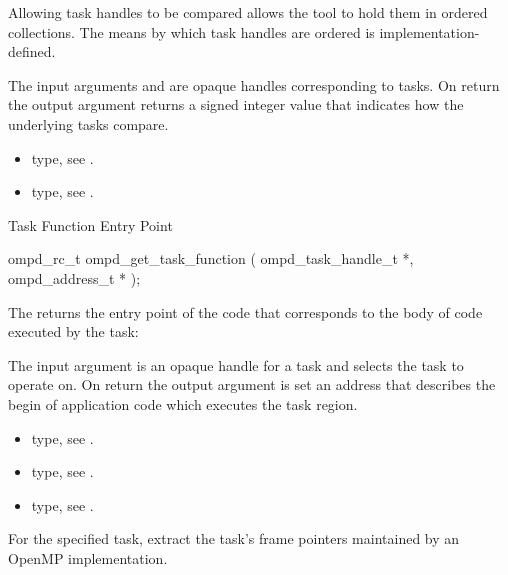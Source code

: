 Allowing task handles to be compared allows the tool to hold them in ordered collections.
The means by which task handles are ordered is implementation-defined.

\argdesc
The input arguments  and  are opaque handles
corresponding to tasks.
On return the output argument   returns a signed
integer value that indicates how the underlying tasks compare.

\crossreferences
\begin{itemize}
  \item {} type, see .
	\item {} type, see .
\end{itemize}



\label{subsubsubsec:ompd_get_task_function}
\summary
Task Function Entry Point
\format
\begin{cspecific}
\begin{ompSyntax}
ompd_rc_t ompd_get_task_function (
  ompd_task_handle_t *,
  ompd_address_t *
);
\end{ompSyntax}
\end{cspecific}

\descr
The  returns the entry point of the code
that corresponds to the body of code executed by the task:

\argdesc
The input argument  is an opaque handle for a task and selects the task to operate on.
On return the output argument  is set an address that describes the begin of application
code which executes the task region.

\crossreferences
\begin{itemize}
  \item {} type, see .
	\item {} type, see .
	\item {} type, see .
\end{itemize}


%
\label{subsubsubsec:ompd_get_task_frame}
\summary
For the specified task, extract the task's frame pointers maintained by an OpenMP implementation.

